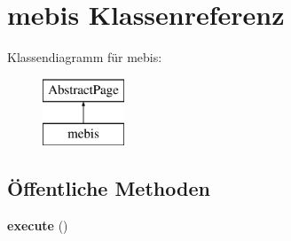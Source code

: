 \hypertarget{classmebis}{}\section{mebis Klassenreferenz}
\label{classmebis}
Klassendiagramm für mebis\+:\begin{figure}[H]
\begin{center}
\leavevmode
\includegraphics[height=2.000000cm]{classmebis}
\end{center}
\end{figure}
\subsection*{Öffentliche Methoden}
\begin{DoxyCompactItemize}
\item 
\mbox{\label{classmebis_aadb55add123db9df7452fd72b9c86441}} 
{\bfseries execute} ()
\end{DoxyCompactItemize}

